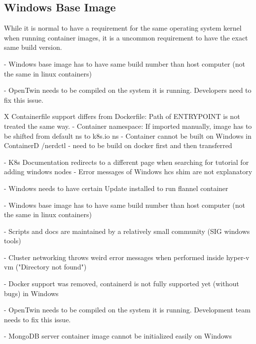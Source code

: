 \subsection{Windows Base Image}
While it is normal to have a requirement for the same operating system kernel when running container images, it is a uncommon requirement to have the exact same build version.

- Windows base image has to have same build number than host computer (not the same in linux containers)

- OpenTwin needs to be compiled on the system it is running. Developers need to fix this issue.




X Containerfile support differs from Dockerfile: Path of ENTRYPOINT is not treated the same way.
- Container namespace: If imported manually, image has to be shifted from default ns to k8s.io ns
	- Container cannot be built on Windows in ContainerD /nerdctl - need to be build on docker first and then transferred

- K8s Documentation redirects to a different page when searching for tutorial for adding windows nodes
- Error messages of Windows hcs shim are not explanatory

- Windows needs to have certain Update installed to run flannel container

- Windows base image has to have same build number than host computer (not the same in linux containers)

- Scripts and docs are maintained by a relatively small community (SIG windows tools)

- Cluster networking throws weird error messages when performed inside hyper-v vm ("Directory not found")

- Docker support was removed, containerd is not fully supported yet (without bugs) in Windows

- OpenTwin needs to be compiled on the system it is running. Development team needs to fix this issue.

- MongoDB server container image cannot be initialized easily on Windows
